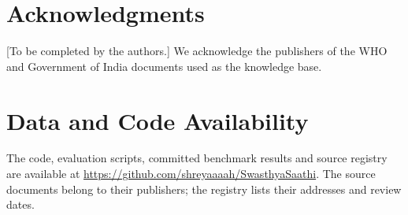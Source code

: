 \documentclass[10pt,a4paper]{article}
\begin{document}
\section*{Acknowledgments}
[To be completed by the authors.] We acknowledge the publishers of the WHO and Government of India documents used as the knowledge base.

\section*{Data and Code Availability}
The code, evaluation scripts, committed benchmark results and source registry are available at \url{https://github.com/shreyaaaah/SwasthyaSaathi}. The source documents belong to their publishers; the registry lists their addresses and review dates.

\end{document}

